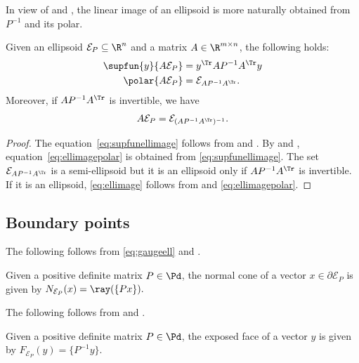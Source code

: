 \documentclass[11pt,twoside,a4paper,openright]{uclouvain-thesis}
\begin{document}
In view of  and ,
the linear image of an ellipsoid is more naturally obtained from $P^{-1}$ and its polar.
\begin{myprop}
  \label{prop:ellimage}
  Given an ellipsoid $\mathcal{E}_{P} \subseteq \R^n$ and
  a matrix $A \in \R^{m \times n}$, the following holds:
  \begin{align}
    \label{eq:supfunellimage}
    \supfun{y}{A\mathcal{E}_{P}} & = y^\Tr AP^{-1}A^{\Tr} y\\
    \label{eq:ellimagepolar}
    \polar{A\mathcal{E}_{P}} & = \mathcal{E}_{AP^{-1}A^{\Tr}}.
  \end{align}
  Moreover, if $AP^{-1}A^{\Tr}$ is invertible, we have
  \begin{equation}
    \label{eq:ellimage}
    A\mathcal{E}_{P} = \mathcal{E}_{(AP^{-1}A^{\Tr})^{-1}}.
  \end{equation}
  \begin{proof}
    The equation~\eqref{eq:supfunellimage} follows from 
    and .
    By  and , equation~\eqref{eq:ellimagepolar}
    is obtained from \eqref{eq:supfunellimage}.
    The set $\mathcal{E}_{AP^{-1}A^{\Tr}}$ is a semi-ellipsoid but it is
    an ellipsoid only if $AP^{-1}A^{\Tr}$ is invertible.
    If it is an ellipsoid, \eqref{eq:ellimage} follows from  and \eqref{eq:ellimagepolar}.
  \end{proof}
\end{myprop}

\subsection{Boundary points}

The following follows from \eqref{eq:gaugeell} and .
\begin{myprop}
  \label{prop:normalell}
  Given a positive definite matrix $P \in \Pd$, the normal cone of a vector $x \in \partial \mathcal{E}_P$ is given by
  \(
    N_{\mathcal{E}_P}(x) = \ray(\{Px\}).
  \)
\end{myprop}

The following follows from  and .
\begin{myprop}
  \label{prop:exposedell}
  Given a positive definite matrix $P \in \Pd$, the exposed face of a vector $y$ is given by
  \(
    F_{\mathcal{E}_P}(y) = \{P^{-1}y\}.
  \)
\end{myprop}
\end{document}

